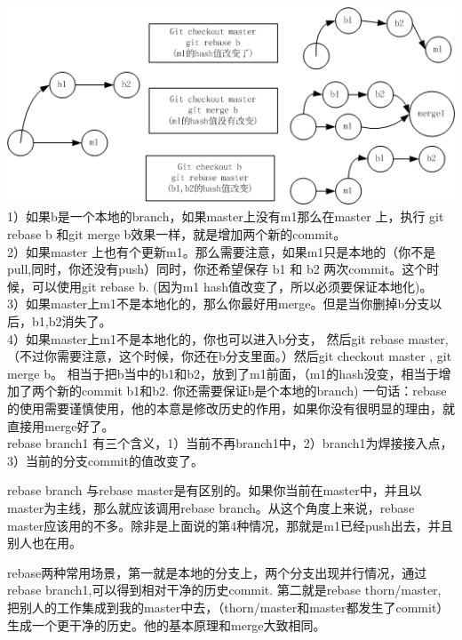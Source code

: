 \documentclass[a4paper,12pt,twoside]{book}
\begin{document}
\begin{CJK*}{UTF8}{song}
\includegraphics[scale=0.7]{pics/git_rebase} \\

1）如果b是一个本地的branch，如果master上没有m1那么在master 上，执行 git rebase b 和git merge b效果一样，就是增加两个新的commit。 \\

2）如果master 上也有个更新m1。那么需要注意，如果m1只是本地的（你不是pull,同时，你还没有push）同时，你还希望保存
b1 和 b2 两次commit。这个时候，可以使用git rebase b. (因为m1 hash值改变了，所以必须要保证本地化)。\\
3）如果master上m1不是本地化的，那么你最好用merge。但是当你删掉b分支以后，b1,b2消失了。\\

4）如果master上m1不是本地化的，你也可以进入b分支， 然后git rebase master,（不过你需要注意，这个时候，你还在b分支里面。）然后git checkout master , git merge b。
相当于把b当中的b1和b2，放到了m1前面，（m1的hash没变，相当于增加了两个新的commit b1和b2. 你还需要保证b是个本地的branch)
一句话：rebase的使用需要谨慎使用，他的本意是修改历史的作用，如果你没有很明显的理由，就直接用merge好了。\\

rebase branch1 有三个含义，1）当前不再branch1中，2）branch1为焊接接入点，3）当前的分支commit的值改变了。

rebase branch 与rebase master是有区别的。如果你当前在master中，并且以master为主线，那么就应该调用rebase branch。从这个角度上来说，rebase master应该用的不多。除非是上面说的第4种情况，那就是m1已经push出去，并且别人也在用。

rebase两种常用场景，第一就是本地的分支上，两个分支出现并行情况，通过rebase branch1,可以得到相对干净的历史commit. 第二就是rebase thorn/master, 把别人的工作集成到我的master中去，（thorn/master和master都发生了commit）生成一个更干净的历史。他的基本原理和merge大致相同。


\end{CJK*}
\end{document}
